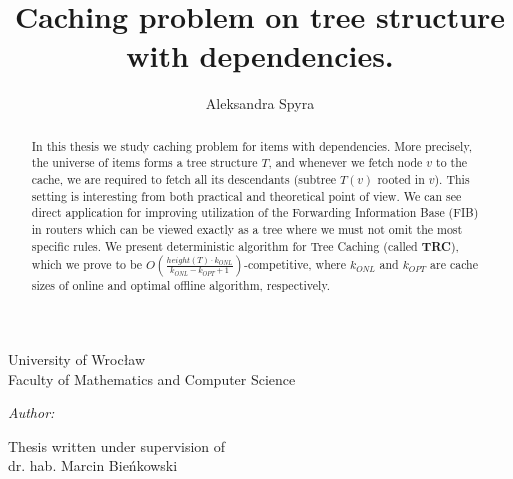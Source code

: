 \documentclass[a4paper,11pt]{article}
\title{Caching problem on tree structure with dependencies.}
\author{Aleksandra Spyra}
\makeatletter
\newcommand{\linia}{\rule{\linewidth}{0.4mm}}
\renewcommand{\maketitle}{
\begin{titlepage}
    \vspace*{1cm}
    \begin{center}
        \small
        University of Wroc\l{}aw\\
        Faculty of Mathematics and Computer Science
    \end{center}
    \vspace{3cm}
    \noindent%
    \begin{center}
        \LARGE \textsc{\@title}
    \end{center}
    \vspace{1cm}
    \begin{center}
        \textit{\small Author:}\\
        \normalsize \textsc{\@author} \par
        \vspace{5cm}
    \end{center}
    \begin{flushright}    
        {\small Thesis written under supervision of}\\
             dr. hab. Marcin Bie\'{n}kowski
    \end{flushright}
    \vspace*{\stretch{6}}
    \begin{center}
        \@date
    \end{center}
\end{titlepage}
\setcounter{page}{2}
}
\makeatother
\begin{document}
\maketitle

\begin{abstract}
In this thesis we study caching problem for items with dependencies.
More precisely, the universe of items forms a tree structure $T$, and whenever
we fetch node $v$ to the cache, we are required to fetch all its descendants
(subtree $T(v)$ rooted in $v$). This setting is interesting from both practical 
and theoretical point of view. We can see direct application for improving 
utilization of the Forwarding Information Base (FIB) in routers which can be 
viewed exactly as a tree where we must not omit the most specific rules. We 
present deterministic algorithm for Tree Caching (called \textbf{TRC}), which 
we 
prove to be $O(\frac{height(T) \cdot k_{ONL}}{k_{ONL} - k_{OPT} + 
1})$-competitive, 
where $k_{ONL}$ and $k_{OPT}$ are cache sizes of online and optimal offline 
algorithm, respectively. 
\end{abstract}

\tableofcontents




\printbibliography
\end{document}
